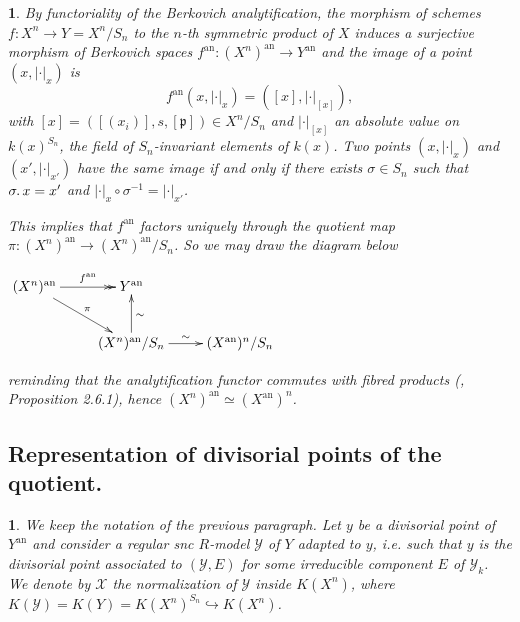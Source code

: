 \documentclass{amsart}%
\numberwithin{equation}{subsection}
\theoremstyle{plain2}
\theoremstyle{definition2}
\theoremstyle{stepstyle}
\theoremstyle{point}
\theoremstyle{subpoint}
\newtheorem{subpoint}[equation]{}%
\newcommand{\spa}[1]{\begin{subpoint}#1\end{subpoint}}           %
\newcommand{\cX}{\ensuremath{\mathscr{X}}}
\newcommand{\fp}{\ensuremath{\mathfrak{p}}}
\newcommand{\cY}{\ensuremath{\mathscr{Y}}}
\renewcommand{\cY}{\ensuremath{\mathscr{Y}}}
\newcommand{\an}{\mathrm{an}}
\begin{document}
\spa{By functoriality of the Berkovich analytification, the morphism of schemes $f: X^n \rightarrow Y=X^n/S_n$ to the $n$-th symmetric product of $X$ induces a surjective morphism of Berkovich spaces $f^\an: (X^n)^\an \rightarrow Y^\an$ and the image of a point $(x,|\cdot|_x)$ is $$f^\an(x,|\cdot|_x)= ([x], |\cdot|_{[x]}),$$ with $[x]=([(x_i)],s,[\fp]) \in X^n/S_n$ and $|\cdot|_{[x]}$ an absolute value on $k(x)^{S_n}$, the field of $S_n$-invariant elements of $k(x)$. Two points $(x,|\cdot|_{x})$ and $(x',|\cdot|_{x'})$ have the same image if and only if there exists $\sigma \in S_n$ such that $\sigma \ldotp x = x'$ and $|\cdot|_x \circ \sigma^{-1}= |\cdot|_{x'}$.

This implies that $f^\an$ factors uniquely through the quotient map $\pi: (X^n)^\an \rightarrow (X^n)^\an/S_n$. So we may draw the diagram below \begin{center}
$\begin{gathered}
\xymatrix{ (X^n)^\an \ar[rd]^-{\pi} \ar@{->>}[r]^-{f^\an} & Y^\an & \\  & (X^n)^\an/S_n \ar[u]_{\sim} \ar[r]^{\sim}& (X^\an)^n/S_n \\
}
\end{gathered}$ \end{center} reminding that the analytification functor commutes with fibred products (\cite{Berkovich1993}, Proposition 2.6.1), hence $(X^n)^\an \simeq (X^\an)^n$.}

\subsection{Representation of divisorial points of the quotient.}
\spa{We keep the notation of the previous paragraph. Let $y$ be a divisorial point of $Y^\an$ and consider a regular snc $R$-model $\cY$ of $Y$ adapted to $y$, i.e. such that $y$ is the divisorial point associated to $(\cY, E)$ for some irreducible component $E$ of $\cY_k$. We denote by $\cX$ the normalization of $\cY$ inside $K(X^n) $, where $K(\cY)=K(Y)=K(X^n)^{S_n} \hookrightarrow K(X^n)$.}
\end{document}
